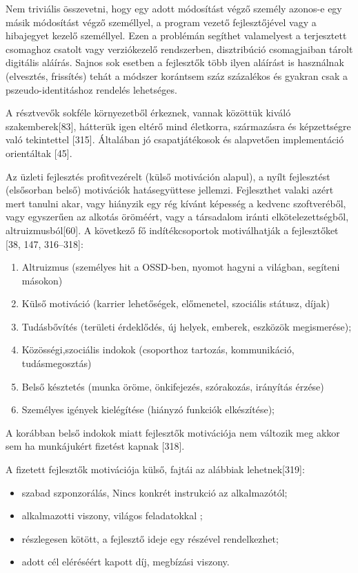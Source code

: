 \documentclass[12pt,magyar,a4paper,oneside]{scrreprt}
\providecommand{\tightlist}{%
  \setlength{\itemsep}{0pt}\setlength{\parskip}{0pt}}
\begin{document}
Nem triviális összevetni, hogy egy adott módosítást végző személy
azonos-e egy másik módosítást végző személlyel, a program vezető
fejlesztőjével vagy a hibajegyet kezelő személlyel. Ezen a problémán
segíthet valamelyest a terjesztett csomaghoz csatolt vagy verziókezelő
rendszerben, disztribúció csomagjaiban tárolt digitális aláírás. Sajnos
sok esetben a fejlesztők több ilyen aláírást is használnak (elvesztés,
frissítés) tehát a módszer korántsem száz százalékos és gyakran csak a
pszeudo-identitáshoz rendelés lehetséges.

A résztvevők sokféle környezetből érkeznek, vannak közöttük kiváló
szakemberek{[}83{]}, hátterük igen eltérő mind életkorra, származásra és
képzettségre való tekintettel {[}315{]}. Általában jó csapatjátékosok és
alapvetően implementáció orientáltak {[}45{]}.

Az üzleti fejlesztés profitvezérelt (külső motiváción alapul), a nyílt
fejlesztést (elsősorban belső) motivációk hatásegyüttese jellemzi.
Fejleszthet valaki azért mert tanulni akar, vagy hiányzik egy rég kívánt
képesség a kedvenc szoftveréből, vagy egyszerűen az alkotás öröméért,
vagy a társadalom iránti elkötelezettségből, altruizmusból{[}60{]}. A
következő fő indítékcsoportok motiválhatják a fejlesztőket {[}38, 147,
316--318{]}:

\begin{enumerate}
\def\labelenumi{\arabic{enumi}.}
\tightlist
\item
  Altruizmus (személyes hit a OSSD-ben, nyomot hagyni a világban,
  segíteni másokon)
\item
  Külső motiváció (karrier lehetőségek, előmenetel, szociális státusz,
  díjak)
\item
  Tudásbővítés (területi érdeklődés, új helyek, emberek, eszközök
  megismerése);
\item
  Közösségi,szociális indokok (csoporthoz tartozás, kommunikáció,
  tudásmegosztás)
\item
  Belső késztetés (munka öröme, önkifejezés, szórakozás, irányítás
  érzése)
\item
  Személyes igények kielégítése (hiányzó funkciók elkészítése);
\end{enumerate}

A korábban belső indokok miatt fejlesztők motivációja nem változik meg
akkor sem ha munkájukért fizetést kapnak {[}318{]}.

A fizetett fejlesztők motivációja külső, fajtái az alábbiak
lehetnek{[}319{]}:

\begin{itemize}
\tightlist
\item
  szabad szponzorálás, Nincs konkrét instrukció az alkalmazótól;
\item
  alkalmazotti viszony, világos feladatokkal ;
\item
  részlegesen kötött, a fejlesztő ideje egy részével rendelkezhet;
\item
  adott cél eléréséért kapott díj, megbízási viszony.
\end{itemize}
\end{document}
